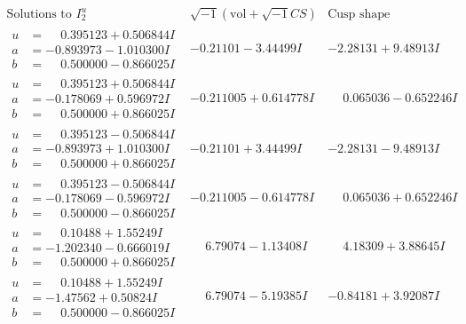 \documentclass[1p]{elsarticle_modified}
\theoremstyle{definition}
\newcommand{\I}{\sqrt{-1}}
\begin{document}
$$\begin{array}{c|c|c}  
\text{Solutions to }I^u_{2}& \I (\text{vol} + \sqrt{-1}CS) & \text{Cusp shape}\\
 \hline 
\begin{aligned}
u &= \phantom{-}0.395123 + 0.506844 I \\
a &= -0.893973 - 1.010300 I \\
b &= \phantom{-}0.500000 - 0.866025 I\end{aligned}
 & -0.21101 - 3.44499 I & -2.28131 + 9.48913 I \\ \hline\begin{aligned}
u &= \phantom{-}0.395123 + 0.506844 I \\
a &= -0.178069 + 0.596972 I \\
b &= \phantom{-}0.500000 + 0.866025 I\end{aligned}
 & -0.211005 + 0.614778 I & \phantom{-}0.065036 - 0.652246 I \\ \hline\begin{aligned}
u &= \phantom{-}0.395123 - 0.506844 I \\
a &= -0.893973 + 1.010300 I \\
b &= \phantom{-}0.500000 + 0.866025 I\end{aligned}
 & -0.21101 + 3.44499 I & -2.28131 - 9.48913 I \\ \hline\begin{aligned}
u &= \phantom{-}0.395123 - 0.506844 I \\
a &= -0.178069 - 0.596972 I \\
b &= \phantom{-}0.500000 - 0.866025 I\end{aligned}
 & -0.211005 - 0.614778 I & \phantom{-}0.065036 + 0.652246 I \\ \hline\begin{aligned}
u &= \phantom{-}0.10488 + 1.55249 I \\
a &= -1.202340 - 0.666019 I \\
b &= \phantom{-}0.500000 + 0.866025 I\end{aligned}
 & \phantom{-}6.79074 - 1.13408 I & \phantom{-}4.18309 + 3.88645 I \\ \hline\begin{aligned}
u &= \phantom{-}0.10488 + 1.55249 I \\
a &= -1.47562 + 0.50824 I \\
b &= \phantom{-}0.500000 - 0.866025 I\end{aligned}
 & \phantom{-}6.79074 - 5.19385 I & -0.84181 + 3.92087 I \\ \hline\begin{aligned}

\end{aligned}
\end{array}$$
\end{document}
